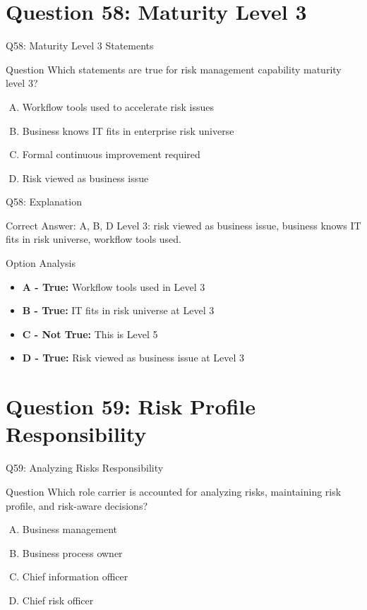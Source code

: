 \documentclass{beamer}
\begin{document}
	\section{Question 58: Maturity Level 3}
	
	\begin{frame}{Q58: Maturity Level 3 Statements}
		\begin{block}{Question}
			Which statements are true for risk management capability maturity level 3?
		\end{block}
		\begin{enumerate}[(A)]
			\item Workflow tools used to accelerate risk issues
			\item Business knows IT fits in enterprise risk universe
			\item Formal continuous improvement required
			\item Risk viewed as business issue
		\end{enumerate}
	\end{frame}
	
	\begin{frame}{Q58: Explanation}
		\begin{block}{Correct Answer: A, B, D}
			Level 3: risk viewed as business issue, business knows IT fits in risk universe, workflow tools used.
		\end{block}
		\begin{block}{Option Analysis}
			\begin{itemize}
				\item \textbf{A - True:} Workflow tools used in Level 3
				\item \textbf{B - True:} IT fits in risk universe at Level 3
				\item \textbf{C - Not True:} This is Level 5
				\item \textbf{D - True:} Risk viewed as business issue at Level 3
			\end{itemize}
		\end{block}
	\end{frame}
	
	\section{Question 59: Risk Profile Responsibility}
	
	\begin{frame}{Q59: Analyzing Risks Responsibility}
		\begin{block}{Question}
			Which role carrier is accounted for analyzing risks, maintaining risk profile, and risk-aware decisions?
		\end{block}
		\begin{enumerate}[(A)]
			\item Business management
			\item Business process owner
			\item Chief information officer
			\item Chief risk officer
		\end{enumerate}
	\end{frame}
	
\end{document}

